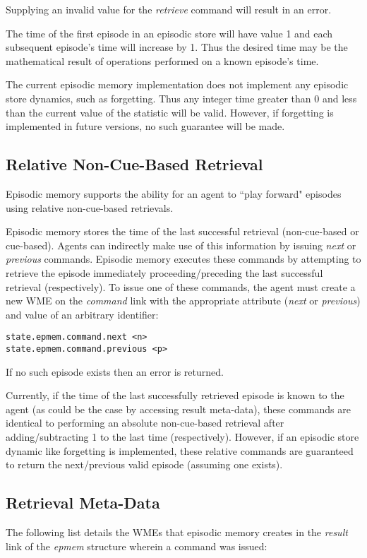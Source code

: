 Supplying an invalid value for the \emph{retrieve} command will result in an error.

The time of the first episode in an episodic store will have value 1 and each subsequent episode's time will increase by 1.  Thus the desired time may be the mathematical result of operations performed on a known episode's time.

The current episodic memory implementation does not implement any episodic store dynamics, such as forgetting.  Thus any integer time greater than 0 and less than the current value of the  statistic will be valid.  However, if forgetting is implemented in future versions, no such guarantee will be made.

\subsection{Relative Non-Cue-Based Retrieval}
Episodic memory supports the ability for an agent to ``play forward" episodes using relative non-cue-based retrievals. 

Episodic memory stores the time of the last successful retrieval (non-cue-based or cue-based).  Agents can indirectly make use of this information by issuing \emph{next} or \emph{previous} commands.  Episodic memory executes these commands by attempting to retrieve the episode immediately proceeding/preceding the last successful retrieval (respectively).  To issue one of these commands, the agent must create a new WME on the \emph{command} link with the appropriate attribute (\emph{next} or \emph{previous}) and value of an arbitrary identifier:

\begin{verbatim}
state.epmem.command.next <n>
state.epmem.command.previous <p>
\end{verbatim}

If no such episode exists then an error is returned.

Currently, if the time of the last successfully retrieved episode is known to the agent (as could be the case by accessing result meta-data), these commands are identical to performing an absolute non-cue-based retrieval after adding/subtracting 1 to the last time (respectively).  However, if an episodic store dynamic like forgetting is implemented, these relative commands are guaranteed to return the next/previous valid episode (assuming one exists).

\subsection{Retrieval Meta-Data}
\label{EPMEM-meta}
The following list details the WMEs that episodic memory creates in the \emph{result} link of the \emph{epmem} structure wherein a command was issued:


